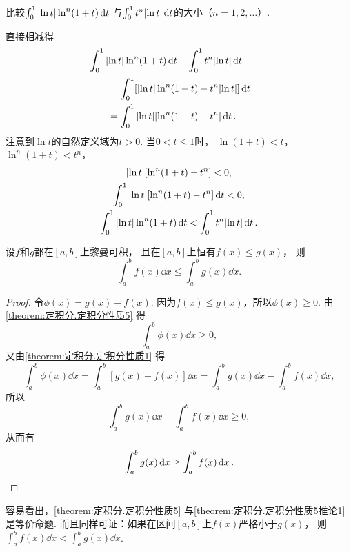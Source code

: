 \begin{example}
比较\(\int_0^1 \abs{\ln t} \ln^n(1+t) \dd{t}\)
与\(\int_0^1 t^n \abs{\ln t} \dd{t}\)的大小（\(n=1,2,\dotsc\)）.
\begin{solution}
直接相减得
\begin{align*}
	&\hspace{-20pt}
	\int_0^1 \abs{\ln t} \ln^n(1+t) \dd{t} - \int_0^1 t^n \abs{\ln t} \dd{t} \\
	&= \int_0^1 [\abs{\ln t} \ln^n(1+t) - t^n \abs{\ln t}] \dd{t} \\
	&= \int_0^1 \abs{\ln t} [\ln^n(1+t) - t^n] \dd{t}.
\end{align*}
注意到\(\ln t\)的自然定义域为\(t > 0\).
当\(0 < t \leq 1\)时，
\(\ln(1+t) < t\)，
\(\ln^n(1+t) < t^n\)，
\begin{gather*}
	\abs{\ln t} [\ln^n(1+t) - t^n] < 0, \\
	\int_0^1 \abs{\ln t} [\ln^n(1+t) - t^n] \dd{t} < 0, \\
	\int_0^1 \abs{\ln t} \ln^n(1+t) \dd{t} < \int_0^1 t^n \abs{\ln t} \dd{t}.
\end{gather*}
\end{solution}
\end{example}

\begin{corollary}\label{theorem:定积分.定积分性质5推论1}
设\(f\)和\(g\)都在\([a,b]\)上黎曼可积，
且在\([a,b]\)上恒有\(f(x) \leq g(x)\)，
则\begin{equation*}
	\int_a^b f(x) \dd{x} \leq \int_a^b g(x) \dd{x}.
\end{equation*}
\begin{proof}
令\(\phi(x) = g(x) - f(x)\).
因为\(f(x) \leq g(x)\)，所以\(\phi(x) \geq 0\).
由\cref{theorem:定积分.定积分性质5} 得\begin{equation*}
	\int_a^b \phi(x) \dd{x} \geq 0,
\end{equation*}
又由\cref{theorem:定积分.定积分性质1} 得\begin{equation*}
	\int_a^b \phi(x) \dd{x}
	= \int_a^b [g(x) - f(x)] \dd{x}
	= \int_a^b g(x) \dd{x} - \int_a^b f(x) \dd{x},
\end{equation*}
所以\begin{equation*}
	\int_a^b g(x) \dd{x} - \int_a^b f(x) \dd{x} \geq 0,
\end{equation*}
从而有\begin{equation*}
	\int_a^b g(x) \dd{x} \geq \int_a^b f(x) \dd{x}.
	\qedhere
\end{equation*}
\end{proof}
\end{corollary}
\begin{remark}
容易看出，\cref{theorem:定积分.定积分性质5} 与\cref{theorem:定积分.定积分性质5推论1} 是等价命题.
而且同样可证：如果在区间\([a,b]\)上\(f(x)\)严格小于\(g(x)\)，
则\(\int_a^b f(x) \dd{x} < \int_a^b g(x) \dd{x}\).
\end{remark}

